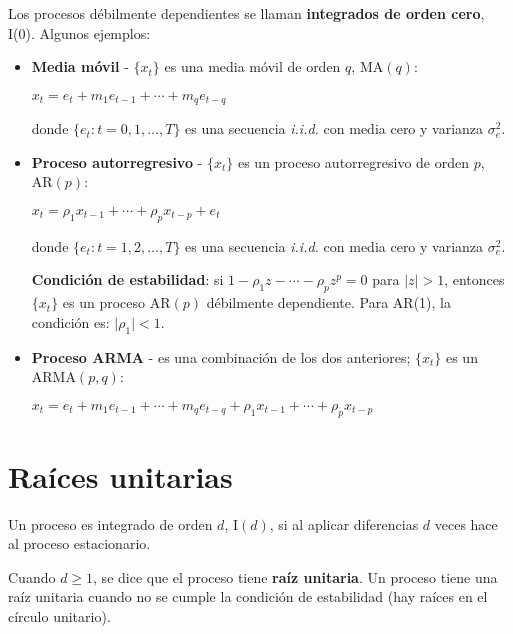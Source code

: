 \documentclass[10pt, a4paper, landscape]{article}
\begin{document}
\begin{multicols}{3}
Los procesos débilmente dependientes se llaman \textbf{integrados de orden cero}, I(0). Algunos ejemplos:

\begin{itemize}[leftmargin=*]
	\item \textbf{Media móvil} - \( \{ x_{t} \} \) es una media móvil de orden \( q \), \( \text{MA}(q) \):
	\begin{center}
		\( x_{t} = e_{t} + m_{1} e_{t - 1} + \cdots + m_{q} e_{t - q} \)
	\end{center}
	donde \( \{ e_{t} : t = 0, 1, \ldots, T \} \) es una secuencia \textsl{i.i.d.} con media cero y varianza \( \sigma_{e}^{2} \).
	\item \textbf{Proceso autorregresivo} - \( \{ x_{t} \} \) es un proceso autorregresivo de orden \( p \), \( \text{AR}(p) \):
	\begin{center}
		\( x_{t} = \rho_{1} x_{t - 1} + \cdots + \rho_{p} x_{t - p} + e_{t} \)
	\end{center}
	donde \( \{ e_{t} : t = 1, 2, \ldots, T \} \) es una secuencia \textsl{i.i.d.} con media cero y varianza \( \sigma_{e}^{2} \).

	\textbf{Condición de estabilidad}: si \( 1 - \rho_{1} z - \cdots - \rho_{p} z^{p} = 0 \) para \( \lvert z \rvert > 1 \), entonces \( \{ x_{t} \} \) es un proceso \( \text{AR}(p) \) débilmente dependiente. Para AR(1), la condición es: \( \lvert \rho_{1} \rvert < 1 \).

	\item \textbf{Proceso ARMA} - es una combinación de los dos anteriores; \( \{ x_{t} \} \) es un \( \text{ARMA}(p, q) \):
	\begin{center}
		\( x_{t} = e_{t} + m_{1} e_{t - 1} + \cdots + m_{q} e_{t - q} + \rho_{1} x_{t - 1} + \cdots + \rho_{p} x_{t - p} \)
	\end{center}
\end{itemize}

\columnbreak

\section*{Raíces unitarias}

Un proceso es integrado de orden \( d \), \( \text{I}(d) \), si al aplicar diferencias \( d \) veces hace al proceso estacionario.

Cuando \( d \geq 1 \), se dice que el proceso tiene \textbf{raíz unitaria}. Un proceso tiene una raíz unitaria cuando no se cumple la condición de estabilidad (hay raíces en el círculo unitario).


\end{multicols}
\end{document}
